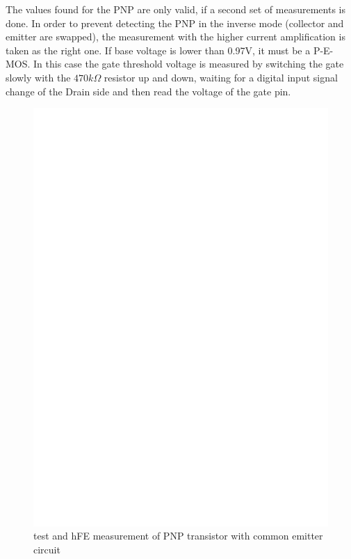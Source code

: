 The values found for the PNP are only valid, if a second
set of measurements is done.
In order to prevent detecting the PNP in the inverse mode (collector and emitter are swapped),
the measurement with the higher current amplification is taken as the right one.
If base voltage is lower than 0.97V, it must be a P-E-MOS.
In this case the gate threshold voltage is measured
by switching the gate slowly with the \(470k\Omega\) resistor up and down, waiting for a digital
input signal change of the Drain side and then read the voltage of the gate pin.

\begin{figure}[H]
\centering
\includegraphics[]{../FIG/PNPce.eps}
\caption{test and hFE measurement of PNP transistor with common emitter circuit }
\label{fig:pnpce}
\end{figure}

